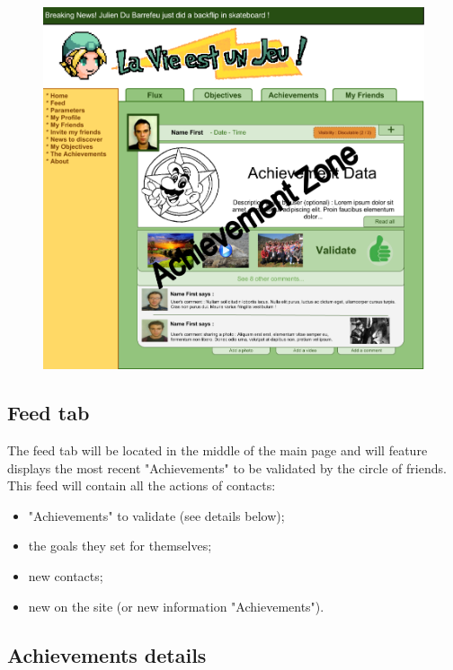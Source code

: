 \documentclass{life-fr}
\begin{document}
\begin{figure}[H]
  \begin{center}
    \includegraphics[width=15cm]{img/accueil.png}
  \end{center}
\end{figure}


\subsection{Feed tab}

The feed tab will be located in the middle of the main page and will feature displays the most recent "Achievements" to be validated by the circle of friends.\\

This feed will contain all the actions of contacts:

\begin{itemize}
  \item "Achievements" to validate (see details below);
  \item the goals they set for themselves;
  \item new contacts;
  \item new on the site (or new information "Achievements").
\end{itemize}

\subsection{Achievements details}
\end{document}
